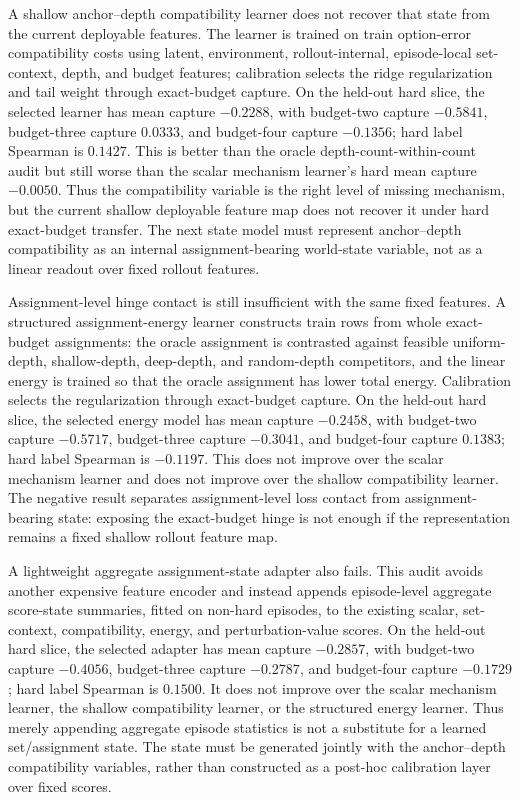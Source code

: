 A shallow anchor--depth compatibility learner does not recover that state from
the current deployable features.  The learner is trained on train option-error
compatibility costs using latent, environment, rollout-internal, episode-local
set-context, depth, and budget features; calibration selects the ridge
regularization and tail weight through exact-budget capture.  On the held-out
hard slice, the selected learner has mean capture $-0.2288$, with budget-two
capture $-0.5841$, budget-three capture $0.0333$, and budget-four capture
$-0.1356$; hard label Spearman is $0.1427$.  This is better than the oracle
depth-count-within-count audit but still worse than the scalar mechanism
learner's hard mean capture $-0.0050$.  Thus the compatibility variable is the
right level of missing mechanism, but the current shallow deployable feature
map does not recover it under hard exact-budget transfer.  The next state model
must represent anchor--depth compatibility as an internal assignment-bearing
world-state variable, not as a linear readout over fixed rollout features.

Assignment-level hinge contact is still insufficient with the same fixed
features.  A structured assignment-energy learner constructs train rows from
whole exact-budget assignments: the oracle assignment is contrasted against
feasible uniform-depth, shallow-depth, deep-depth, and random-depth competitors,
and the linear energy is trained so that the oracle assignment has lower total
energy.  Calibration selects the regularization through exact-budget capture.
On the held-out hard slice, the selected energy model has mean capture
$-0.2458$, with budget-two capture $-0.5717$, budget-three capture $-0.3041$,
and budget-four capture $0.1383$; hard label Spearman is $-0.1197$.  This does
not improve over the scalar mechanism learner and does not improve over the
shallow compatibility learner.  The negative result separates assignment-level
loss contact from assignment-bearing state: exposing the exact-budget hinge is
not enough if the representation remains a fixed shallow rollout feature map.

A lightweight aggregate assignment-state adapter also fails.  This audit avoids
another expensive feature encoder and instead appends episode-level aggregate
score-state summaries, fitted on non-hard episodes, to the existing scalar,
set-context, compatibility, energy, and perturbation-value scores.  On the
held-out hard slice, the selected adapter has mean capture $-0.2857$, with
budget-two capture $-0.4056$, budget-three capture $-0.2787$, and budget-four
capture $-0.1729$; hard label Spearman is $0.1500$.  It does not improve over
the scalar mechanism learner, the shallow compatibility learner, or the
structured energy learner.  Thus merely appending aggregate episode statistics
is not a substitute for a learned set/assignment state.  The state must be
generated jointly with the anchor--depth compatibility variables, rather than
constructed as a post-hoc calibration layer over fixed scores.


